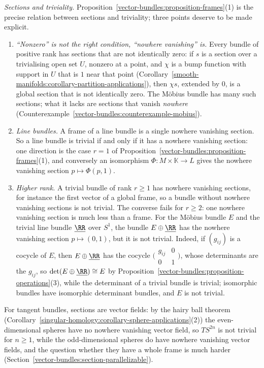 \begin{remark}\label{vector-bundles:remark-sections-triviality}
\emph{Sections and triviality.} Proposition~\ref{vector-bundles:proposition-frames}(1) is the precise relation between sections and triviality; three points deserve to be made explicit.
\begin{enumerate}
\item \emph{``Nonzero'' is not the right condition, ``nowhere vanishing'' is.} Every bundle of positive rank has sections that are not identically zero: if $s$ is a section over a trivialising open set $U$, nonzero at a point, and $\chi$ is
a bump function with support in $U$ that is $1$ near that point (Corollary~\ref{smooth-manifolds:corollary-partition-applications}), then $\chi s$, extended by $0$, is a global section that is not identically zero. The M\"obius
bundle has many such sections; what it lacks are sections that vanish \emph{nowhere} (Counterexample~\ref{vector-bundles:counterexample-mobius}).
\item \emph{Line bundles.} A frame of a line bundle is a single nowhere vanishing section. So a line bundle is trivial if and only if it has a nowhere vanishing section: one direction is the case $r = 1$ of
Proposition~\ref{vector-bundles:proposition-frames}(1), and conversely an isomorphism $\Phi \colon M \times \mathbb{K} \to L$ gives the nowhere vanishing section $p \mapsto \Phi(p, 1)$.
\item \emph{Higher rank.} A trivial bundle of rank $r \geq 1$ has nowhere vanishing sections, for instance the first vector of a global frame, so a bundle without nowhere vanishing sections is not trivial. The converse fails for
$r \geq 2$: one nowhere vanishing section is much less than a frame. For the M\"obius bundle $E$ and the trivial line bundle $\underline{\RR}$ over $S^1$, the bundle $E \oplus \underline{\RR}$ has the nowhere vanishing section
$p \mapsto (0, 1)$, but it is not trivial. Indeed, if $(g_{ij})$ is a cocycle of $E$, then $E \oplus \underline{\RR}$ has the cocycle $\bigl(\begin{smallmatrix}g_{ij} & 0\\ 0 & 1\end{smallmatrix}\bigr)$, whose determinants are the
$g_{ij}$, so $\det(E \oplus \underline{\RR}) \cong E$ by Proposition~\ref{vector-bundles:proposition-operations}(3), while the determinant of a trivial bundle is trivial; isomorphic bundles have isomorphic determinant bundles, and $E$ is
not trivial.
\end{enumerate}
For tangent bundles, sections are vector fields: by the hairy ball theorem (Corollary~\ref{singular-homology:corollary-sphere-applications}(2)) the even-dimensional spheres have no nowhere vanishing vector field, so
$TS^{2n}$ is not trivial for $n \geq 1$, while the odd-dimensional spheres do have nowhere vanishing vector fields, and the question whether they have a whole frame is much harder
(Section~\ref{vector-bundles:section-parallelizable}).
\end{remark}

